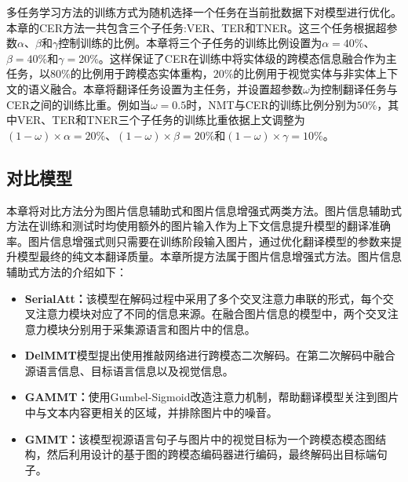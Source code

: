 多任务学习方法的训练方式为随机选择一个任务在当前批数据下对模型进行优化。本章的CER方法一共包含三个子任务:VER、TER和TNER。这三个任务根据超参数$\alpha$、$\beta$和$\gamma$控制训练的比例。本章将三个子任务的训练比例设置为$\alpha=40\%$、$\beta=40\%$和$\gamma=20\%$。这样保证了CER在训练中将实体级的跨模态信息融合作为主任务，以$80\%$的比例用于跨模态实体重构，$20\%$的比例用于视觉实体与非实体上下文的语义融合。本章将翻译任务设置为主任务，并设置超参数$\omega$为控制翻译任务与CER之间的训练比重。例如当$\omega=0.5$时，NMT与CER的训练比例分别为$50\%$，其中VER、TER和TNER三个子任务的训练比重依据上文调整为$(1-\omega)\times\alpha=20\%$、$(1-\omega)\times\beta=20\%$和$(1-\omega)\times\gamma=10\%$。



\subsection{对比模型}
\label{sec:4_comparison}

本章将对比方法分为图片信息辅助式和图片信息增强式两类方法。图片信息辅助式方法在训练和测试时均使用额外的图片输入作为上下文信息提升模型的翻译准确率。图片信息增强式则只需要在训练阶段输入图片，通过优化翻译模型的参数来提升模型最终的纯文本翻译质量。本章所提方法属于图片信息增强式方法。图片信息辅助式方法的介绍如下：

\begin{itemize}

\item \textbf{SerialAtt：}该模型在解码过程中采用了多个交叉注意力串联的形式，每个交叉注意力模块对应了不同的信息来源。在融合图片信息的模型中，两个交叉注意力模块分别用于采集源语言和图片中的信息。


\item \textbf{DelMMT}模型提出使用推敲网络进行跨模态二次解码。在第二次解码中融合源语言信息、目标语言信息以及视觉信息。

\item \textbf{GAMMT：}使用Gumbel-Sigmoid改造注意力机制，帮助翻译模型关注到图片中与文本内容更相关的区域，并排除图片中的噪音。

\item \textbf{GMMT：}该模型视源语言句子与图片中的视觉目标为一个跨模态模态图结构，然后利用设计的基于图的跨模态编码器进行编码，最终解码出目标端句子。
\end{itemize}

